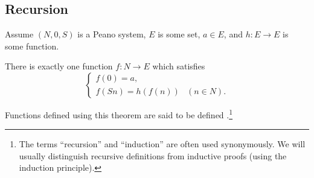 \subsection{Recursion}
\begin{theorem}
Assume $(N,0,S)$ is a Peano system, $E$ is some set, $a\in E$, and $h:E\to E$ is some function.

There is exactly one function $f: N\to E$ which satisfies
\[ \begin{cases}
f(0) = a, \\
f(Sn) = h(f(n)) & (n\in N).
\end{cases} \]
\end{theorem}
Functions defined using this theorem are said to be defined .\footnote{The terms ``recursion'' and ``induction'' are often used synonymously. We
will usually distinguish recursive definitions from inductive
proofs (using the induction principle).}
